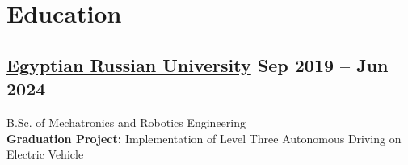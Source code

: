 \section*{Education}
%
%
%
\subsection*{
  \href{https://www.eru.edu.eg/}{Egyptian Russian University}
  \hspace*{\fill}
  \smallFormat Sep 2019 -- Jun 2024
}
B.Sc. of Mechatronics and Robotics Engineering\\
\textbf{Graduation Project:} Implementation of Level Three Autonomous Driving on Electric Vehicle